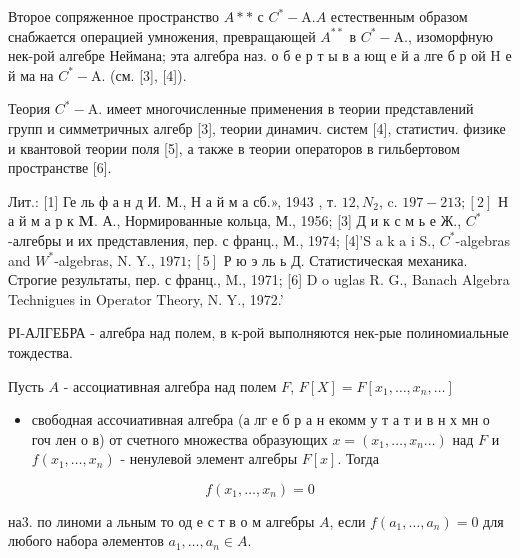 \documentclass[10pt]{article}
\begin{document}
Второе сопряженное пространство $A * *$ с $C^{*}-\mathrm{A} . A$ естественным образом снабжается операцией умножения, превращающей $A^{* *}$ в $C^{*}-\mathrm{A} .$, изоморфную нек-рой алгебре Неймана; эта алгебра наз. о б е р т ы в а ющ е й а лге б р ой $\mathrm{H}$ е й ма на $C^{*}-\mathrm{A}$. (см. [3], [4]).



Теория $C^{*}-\mathrm{A}$. имеет многочисленные применения в теории представлений групп и симметричных алгебр [3], теории динамич. систем [4], статистич. физике и квантовой теории поля [5], а также в теории операторов в гильбертовом пространстве [6].



Лит.: [1] Ге ль ф а н д И. М., Н а й м а сб.», 1943 , т. $12, N_{2}$, c. $197-213 ;[2]$ Н а й м а $р$ к $\mathbf{M}$. А., Нормированные кольца, М., 1956; [3] Д и к с м ь е Ж., $C^{*}$-алгебры и их представления, пер. с франц., М., 1974; [4]'S a k a i S., $C^{*}$-algebras and $W^{*}$-algebras, N. Y., $1971 ;[5]$ Р ю э ль ь Д. Статистическая механика. Строгие результаты, пер. с франц., M., 1971; [6] D o uglas R. G., Banach Algebra Technigues in Operator Theory, N. Y., 1972.'



РІ-АЛГЕБРА - алгебра над полем, в к-рой выполняются нек-рые полиномиальные тождества.



Пусть $A$ - ассоциативная алгебра над полем $F$, $F[X]=F\left[x_{1}, \ldots, x_{n}, \ldots\right]$



\begin{itemize}

  \item свободная ассочиативная алгебра (а лг е б р а н екомм у т а т и в н х мн о гоч лен о в) от счетного множества образующих $x=\left(x_{1}, \ldots, x_{n} \ldots\right)$ над $F$ и $f\left(x_{1}, \ldots, x_{n}\right)$ - ненулевой элемент алгебры $F[x]$. Тогда

\end{itemize}



\[

f\left(x_{1}, \ldots, x_{n}\right)=0

\]



на3. по линоми а льным то од е с т в о м алгебры $A$, если $f\left(a_{1}, \ldots, a_{n}\right)=0$ для любого набора әлементов $a_{1}, \ldots, a_{n} \in A$.
\end{document}
